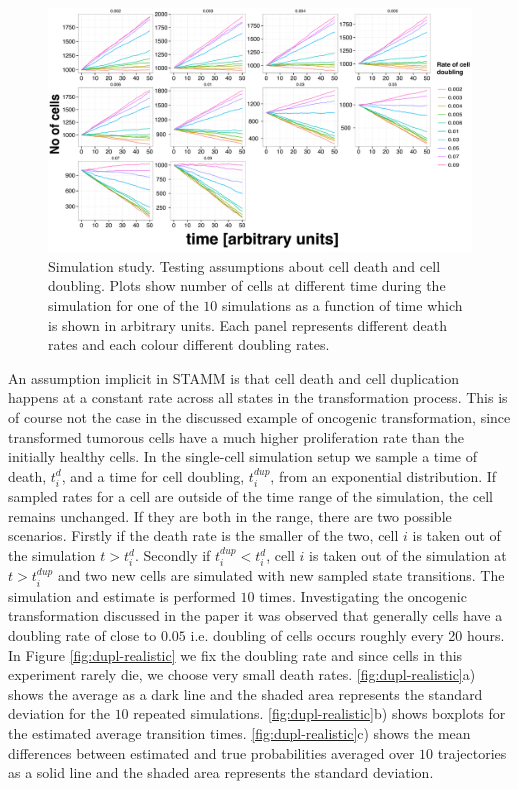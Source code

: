\begin{figure}
    \centering \includegraphics[width=1\textwidth]{pics/n-cell.pdf}
    \caption{Simulation study. Testing assumptions about cell death and cell doubling. Plots show number of cells at different time during the simulation for one of the $10$ simulations as a function of time which is shown in arbitrary units. Each panel represents different death rates and each colour different doubling rates.}
\label{fig:no-cells-dupl}
\end{figure}

An assumption implicit in STAMM is that cell death and cell duplication happens at a constant rate across all states in the transformation process. This is of course not the case in the discussed example of oncogenic transformation, since transformed tumorous cells have a much higher proliferation rate than the initially healthy cells. In the single-cell simulation setup we sample a time of death, $t_i^{d}$, and a time for cell doubling, $t_i^{dup}$, from an exponential distribution. If sampled rates for a cell are outside of the time range of the simulation, the cell remains unchanged. If they are both in the range, there are two possible scenarios. Firstly if the death rate is the smaller of the two, cell $i$ is taken out of the simulation $t>t_i^d$. Secondly if $t_i^{dup}<t_i^d$, cell $i$ is taken out of the simulation at $t > t_i^{dup}$ and two new cells are simulated with new sampled state transitions. The simulation and estimate is performed $10$ times. Investigating the oncogenic transformation discussed in the paper it was observed that generally cells have a doubling rate of close to $0.05$ i.e. doubling of cells occurs roughly every 20 hours. In Figure \ref{fig:dupl-realistic} we fix the doubling rate and since cells in this experiment rarely die, we choose very small death rates. \ref{fig:dupl-realistic}a) shows the average as a dark line and the shaded area represents the standard deviation for the $10$ repeated simulations. \ref{fig:dupl-realistic}b) shows boxplots for the estimated average transition times. \ref{fig:dupl-realistic}c) shows the mean differences between estimated and true probabilities averaged over $10$ trajectories as a solid line and the shaded area represents the standard deviation.

